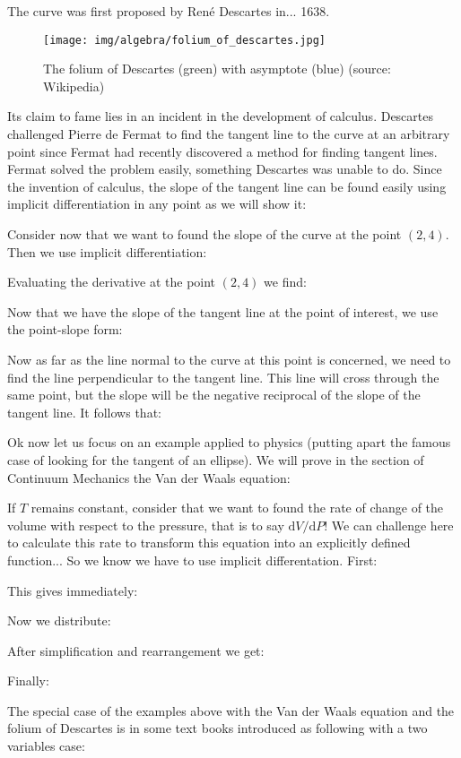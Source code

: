 	The curve was first proposed by René Descartes in... 1638.
	\begin{figure}[H]
		\centering
			\texttt{[image: img/algebra/folium\_of\_descartes.jpg]}
		\caption{The folium of Descartes (green) with asymptote (blue) (source: Wikipedia)}
	\end{figure}
	Its claim to fame lies in an incident in the development of calculus. Descartes challenged Pierre de Fermat to find the tangent line to the curve at an arbitrary point since Fermat had recently discovered a method for finding tangent lines. Fermat solved the problem easily, something Descartes was unable to do. Since the invention of calculus, the slope of the tangent line can be found easily using implicit differentiation in any point as we will show it:
	
	Consider now that we want to found the slope of the curve at the point $(2,4)$. Then we use implicit differentiation: 
	
	Evaluating the derivative at the point $(2,4)$ we find:
	
	Now that we have the slope of the tangent line at the point of interest, we use the point-slope form:
	
	Now as far as the line normal to the curve at this point is concerned, we need to find the line perpendicular to the tangent line. This line will cross through the same point, but the slope will be the negative reciprocal of the slope of the tangent line. It follows that:
	
	
	Ok now let us focus on an example applied to physics (putting apart the famous case of looking for the tangent of an ellipse). We will prove in the section of Continuum Mechanics the Van der Waals equation:
	
	If $T$ remains constant, consider that we want to found the rate of change of the volume with respect to the pressure, that is to say $\mathrm{d}V/\mathrm{d}P$! We can challenge here to calculate this rate to transform this equation into an explicitly defined function... So we know we have to use implicit differentation. First:
	
	This gives immediately:
	
	Now we distribute:
	
	After simplification and rearrangement we get:
	
	Finally:
	
	The special case of the examples above with the Van der Waals equation and the folium of Descartes is in some text books introduced as following with a two variables case:
	
